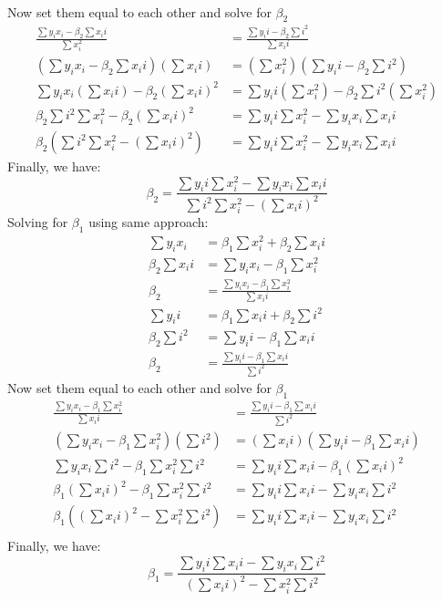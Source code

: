 \documentclass[12pt]{article}
\begin{document}
\begin{enumerate}[1.]
\begin{enumerate}[(a)]
\begin{align*}
            \end{align*}
            Now set them equal to each other and solve for $\beta_2$
            \begin{align*}
                \frac{\sum  y_i x_i - \beta_2\sum  x_i i}{\sum  x_i^2} &= \frac{ \sum  y_i i - \beta_2\sum  i^2}{\sum  x_i i} \\
                (\sum  y_i x_i - \beta_2\sum  x_i i) (\sum  x_i i) &= (\sum  x_i^2)(\sum  y_i i - \beta_2\sum  i^2) \\
                \sum  y_i x_i (\sum  x_i i) - \beta_2(\sum  x_i i)^2  &= \sum  y_i i (\sum  x_i^2) - \beta_2\sum  i^2 (\sum  x_i^2) \\
                \beta_2\sum  i^2 \sum  x_i^2 - \beta_2 (\sum  x_i i)^2 &= \sum  y_i i \sum  x_i^2 - \sum  y_i x_i \sum  x_i i \\
                \beta_2(\sum  i^2 \sum  x_i^2 - (\sum  x_i i)^2) &= \sum  y_i i \sum  x_i^2 - \sum  y_i x_i \sum  x_i i
            \end{align*}
            Finally, we have:
            \[ \beta_2 = \frac{\sum  y_i i \sum  x_i^2 - \sum  y_i x_i \sum  x_i i}{\sum  i^2 \sum  x_i^2 - (\sum  x_i i)^2}\]
            Solving for $\beta_1$ using same approach:
            \begin{align*}
                \sum  y_i x_i &= \beta_1\sum  x_i^2 + \beta_2\sum  x_i i \\ 
                \beta_2\sum  x_i i &= \sum  y_i x_i - \beta_1\sum  x_i^2 \\ 
                \beta_2 &= \frac{\sum  y_i x_i - \beta_1\sum  x_i^2}{\sum  x_i i} \\ 
                \sum  y_i i &= \beta_1\sum  x_i i + \beta_2\sum  i^2 \\ 
                \beta_2\sum  i^2 &= \sum  y_i i - \beta_1\sum  x_i i \\ 
                \beta_2 &= \frac{\sum  y_i i - \beta_1\sum  x_i i}{\sum  i^2}
            \end{align*}
            Now set them equal to each other and solve for $\beta_1$
            \begin{align*}
                \frac{\sum  y_i x_i - \beta_1\sum  x_i^2}{\sum  x_i i} &= \frac{\sum  y_i i - \beta_1\sum  x_i i}{\sum  i^2} \\
                (\sum  y_i x_i - \beta_1\sum  x_i^2)(\sum  i^2) &= (\sum  x_i i)(\sum  y_i i - \beta_1\sum  x_i i) \\
                \sum  y_i x_i \sum  i^2 - \beta_1\sum  x_i^2\sum  i^2 &= \sum  y_i i\sum  x_i i - \beta_1(\sum  x_i i)^2 \\
                \beta_1(\sum  x_i i)^2  - \beta_1\sum  x_i^2\sum  i^2 &= \sum  y_i i\sum  x_i i - \sum  y_i x_i \sum  i^2 \\
                \beta_1((\sum  x_i i)^2 - \sum  x_i^2\sum  i^2) &= \sum  y_i i\sum  x_i i - \sum  y_i x_i \sum  i^2 \\
            \end{align*}
            Finally, we have:
            \[ \beta_1 = \frac{\sum y_i i\sum x_i i - \sum y_i x_i \sum i^2}{(\sum x_i i)^2 - \sum x_i^2 \sum i^2 }\]


\end{enumerate}
\end{enumerate}
\end{document}

